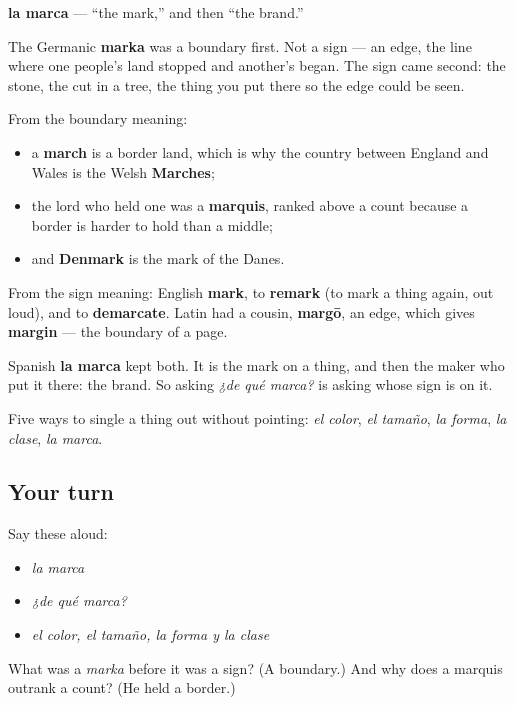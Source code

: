 \begin{cousinweb}
\textbf{la marca} — \textquotedblleft{}the mark,\textquotedblright{} and then \textquotedblleft{}the brand.\textquotedblright{}

The Germanic \textbf{marka} was a boundary first. Not a sign — an edge, the line where one people's land stopped and another's began. The sign came second: the stone, the cut in a tree, the thing you put there so the edge could be seen.

From the boundary meaning:

\begin{itemize}
\raggedright
  \item a \textbf{march} is a border land, which is why the country between England and Wales is the Welsh \textbf{Marches};
  \item the lord who held one was a \textbf{marquis}, ranked above a count because a border is harder to hold than a middle;
  \item and \textbf{Denmark} is the mark of the Danes.
\end{itemize}

From the sign meaning: English \textbf{mark}, to \textbf{remark} (to mark a thing again, out loud), and to \textbf{demarcate}. Latin had a cousin, \textbf{margō}, an edge, which gives \textbf{margin} — the boundary of a page.

Spanish \textbf{la marca} kept both. It is the mark on a thing, and then the maker who put it there: the brand. So asking \emph{¿de qué marca?} is asking whose sign is on it.
\end{cousinweb}

\begin{grammarlens}[title={What you've built}]
Five ways to single a thing out without pointing: \emph{el color}, \emph{el tamaño}, \emph{la forma}, \emph{la clase}, \emph{la marca}.
\end{grammarlens}

\subsection*{Your turn}
Say these aloud:

\begin{itemize}
\raggedright
  \item \emph{la marca}
  \item \emph{¿de qué marca?}
  \item \emph{el color, el tamaño, la forma y la clase}
\end{itemize}

\begin{tcolorbox}[breakable,colback=teal!4,colframe=teal!35!black,title={Before you move on}]
What was a \emph{marka} before it was a sign? (A boundary.) And why does a marquis outrank a count? (He held a border.)
\end{tcolorbox}
